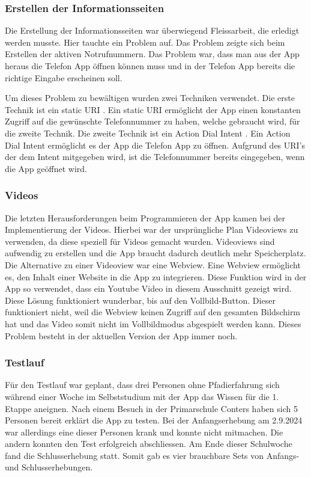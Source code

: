 \subsubsection{Erstellen der Informationsseiten}

Die Erstellung der Informationsseiten war überwiegend Fleissarbeit, die erledigt werden musste. Hier tauchte ein Problem auf. Das Problem zeigte sich beim Erstellen der aktiven Notrufnummern. Das Problem war, dass man aus der App heraus die Telefon App öffnen können muss und in der Telefon App bereits die richtige Eingabe erscheinen soll.\par
Um dieses Problem zu bewältigen wurden zwei Techniken verwendet. Die erste Technik ist ein static URI \cite{noauthor_uri_nodate}. Ein static URI ermöglicht der App einen konstanten Zugriff auf die gewünschte Telefonnummer zu haben, welche gebraucht wird, für die zweite Technik. Die zweite Technik ist ein Action Dial Intent \cite{noauthor_intent_nodate}. Ein Action Dial Intent ermöglicht es der App die Telefon App zu öffnen. Aufgrund des URI's der dem Intent mitgegeben wird, ist die Telefonnummer bereits eingegeben, wenn die App geöffnet wird.

\subsubsection{Videos}

Die letzten Herausforderungen beim Programmieren der App kamen bei der Implementierung der Videos. Hierbei war der ursprüngliche Plan Videoviews zu verwenden, da diese speziell für Videos gemacht wurden. Videoviews sind aufwendig zu erstellen und die App braucht dadurch deutlich mehr Speicherplatz. Die Alternative zu einer Videoview war eine Webview. Eine Webview ermöglicht es, den Inhalt einer Website in die App zu integrieren. Diese Funktion wird in der App so verwendet, dass ein Youtube Video in diesem Ausschnitt gezeigt wird. Diese Lösung funktioniert wunderbar, bis auf den Vollbild-Button. Dieser funktioniert nicht, weil die Webview keinen Zugriff auf den gesamten Bildschirm hat und das Video somit nicht im Vollbildmodus abgespielt werden kann. Dieses Problem besteht in der aktuellen Version der App immer noch.

\subsubsection{Testlauf}

Für den Testlauf war geplant, dass drei Personen ohne Pfadierfahrung sich während einer Woche im Selbststudium mit der App das Wissen für die 1. Etappe aneignen. Nach einem Besuch in der Primarschule Conters haben sich 5 Personen bereit erklärt die App zu testen. Bei der Anfangserhebung am 2.9.2024 war allerdings eine dieser Personen krank und konnte nicht mitmachen. Die andern konnten den Test erfolgreich abschliessen. Am Ende dieser Schulwoche fand die Schlusserhebung statt. Somit gab es vier brauchbare Sets von Anfangs- und Schlusserhebungen.

